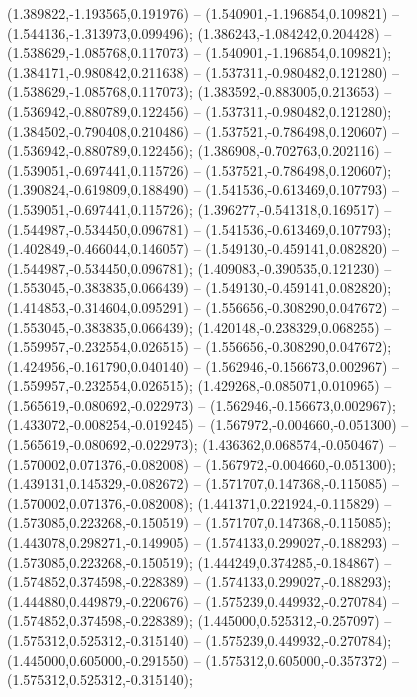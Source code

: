  (1.389822,-1.193565,0.191976) -- (1.540901,-1.196854,0.109821) -- (1.544136,-1.313973,0.099496);
 (1.386243,-1.084242,0.204428) -- (1.538629,-1.085768,0.117073) -- (1.540901,-1.196854,0.109821);
 (1.384171,-0.980842,0.211638) -- (1.537311,-0.980482,0.121280) -- (1.538629,-1.085768,0.117073);
 (1.383592,-0.883005,0.213653) -- (1.536942,-0.880789,0.122456) -- (1.537311,-0.980482,0.121280);
 (1.384502,-0.790408,0.210486) -- (1.537521,-0.786498,0.120607) -- (1.536942,-0.880789,0.122456);
 (1.386908,-0.702763,0.202116) -- (1.539051,-0.697441,0.115726) -- (1.537521,-0.786498,0.120607);
 (1.390824,-0.619809,0.188490) -- (1.541536,-0.613469,0.107793) -- (1.539051,-0.697441,0.115726);
 (1.396277,-0.541318,0.169517) -- (1.544987,-0.534450,0.096781) -- (1.541536,-0.613469,0.107793);
 (1.402849,-0.466044,0.146057) -- (1.549130,-0.459141,0.082820) -- (1.544987,-0.534450,0.096781);
 (1.409083,-0.390535,0.121230) -- (1.553045,-0.383835,0.066439) -- (1.549130,-0.459141,0.082820);
 (1.414853,-0.314604,0.095291) -- (1.556656,-0.308290,0.047672) -- (1.553045,-0.383835,0.066439);
 (1.420148,-0.238329,0.068255) -- (1.559957,-0.232554,0.026515) -- (1.556656,-0.308290,0.047672);
 (1.424956,-0.161790,0.040140) -- (1.562946,-0.156673,0.002967) -- (1.559957,-0.232554,0.026515);
 (1.429268,-0.085071,0.010965) -- (1.565619,-0.080692,-0.022973) -- (1.562946,-0.156673,0.002967);
 (1.433072,-0.008254,-0.019245) -- (1.567972,-0.004660,-0.051300) -- (1.565619,-0.080692,-0.022973);
 (1.436362,0.068574,-0.050467) -- (1.570002,0.071376,-0.082008) -- (1.567972,-0.004660,-0.051300);
 (1.439131,0.145329,-0.082672) -- (1.571707,0.147368,-0.115085) -- (1.570002,0.071376,-0.082008);
 (1.441371,0.221924,-0.115829) -- (1.573085,0.223268,-0.150519) -- (1.571707,0.147368,-0.115085);
 (1.443078,0.298271,-0.149905) -- (1.574133,0.299027,-0.188293) -- (1.573085,0.223268,-0.150519);
 (1.444249,0.374285,-0.184867) -- (1.574852,0.374598,-0.228389) -- (1.574133,0.299027,-0.188293);
 (1.444880,0.449879,-0.220676) -- (1.575239,0.449932,-0.270784) -- (1.574852,0.374598,-0.228389);
 (1.445000,0.525312,-0.257097) -- (1.575312,0.525312,-0.315140) -- (1.575239,0.449932,-0.270784);
 (1.445000,0.605000,-0.291550) -- (1.575312,0.605000,-0.357372) -- (1.575312,0.525312,-0.315140);
